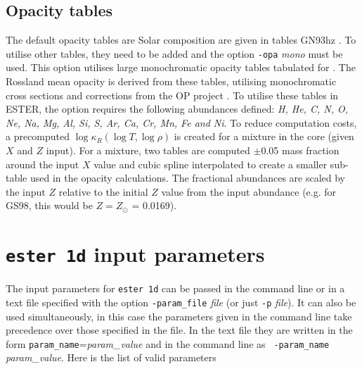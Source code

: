 \subsection{Opacity tables} 

The default opacity tables are Solar composition are given in tables
GN93hz \citep{GN93}. To utilise other tables, they need to be
added and the option {\tt -opa} \textit{mono} must be
used. This option utilises large monochromatic opacity tables tabulated
for \cite{Mombarg2022}. The Rossland mean opacity is derived from these
tables, utilising monochromatic cross sections and corrections from
the OP project \citep{Seaton2005}. To utilise these tables in ESTER,
the option requires the following abundances defined: \textit{H, He,
C, N, O, Ne, Na, Mg, Al, Si, S, Ar, Ca, Cr, Mn, Fe and Ni}. To reduce
computation costs, a precomputed $\log\kappa_R(\log T,\log\rho)$
is created for a mixture in the core (given $X$ and $Z$ input). For a mixture,
two tables are computed $\pm$0.05 mass fraction around the input $X$ value
and cubic spline interpolated to create a smaller sub-table used in the
opacity calculations. The fractional abundances are scaled by the input $Z$
relative to the initial $Z$ value from the input abundance (e.g. for GS98,
this would be $Z = Z_\odot$ = 0.0169).

\section{{\tt ester 1d} input parameters}\label{ester1dinput}

The input parameters for {\tt ester 1d} can be passed in the command line
or in a text file specified with the option {\tt -param\_file} {\it file}
(or just {\tt -p} {\it file}). It can also be used simultaneously, in
this case the parameters given in the command line take precedence over
those specified in the file. In the text file they are written in the
form {\tt param\_name}={\it param\_value} and in the command line as {\tt
-param\_name} {\it param\_value}.  Here is the list of valid parameters

